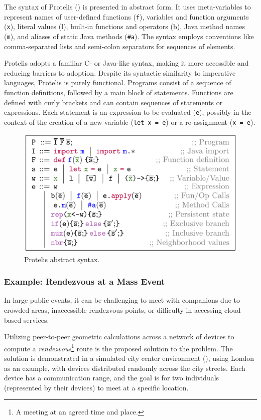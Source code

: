 The syntax of Protelis () is presented in abstract form. It uses meta-variables to represent names of user-defined functions (\texttt{f}), variables and function arguments (\texttt{x}), literal values (l), built-in functions and operators (b), Java method names (\texttt{m}), and aliases of static Java methods (\texttt{\#a}). The syntax employs conventions like comma-separated lists and semi-colon separators for sequences of elements.

Protelis adopts a familiar C- or Java-like syntax, making it more accessible and reducing barriers to adoption. Despite its syntactic similarity to imperative languages, Protelis is purely functional. Programs consist of a sequence of function definitions, followed by a main block of statements. Functions are defined with curly brackets and can contain sequences of statements or expressions. Each statement is an expression to be evaluated (\texttt{e}), possibly in the context of the creation of a new variable (\texttt{let x = e}) or a re-assignment (\texttt{x = e}).

\begin{figure}
    \centering
    \includegraphics[width=.8\linewidth]{figures/protelis-syntax.png}
    \caption{Protelis abstract syntax.}
    \label{fig:protelis-syntax}
\end{figure}

\subsubsection{Example: Rendezvous at a Mass Event}

In large public events, it can be challenging to meet with companions due to crowded areas, inaccessible rendezvous points, or difficulty in accessing cloud-based services.

Utilizing peer-to-peer geometric calculations across a network of devices to compute a \textit{rendezvous}\footnote{A meeting at an agreed time and place.} route is the proposed solution to the problem. The solution is demonstrated in a simulated city center environment (), using London as an example, with devices distributed randomly across the city streets. Each device has a communication range, and the goal is for two individuals (represented by their devices) to meet at a specific location.

